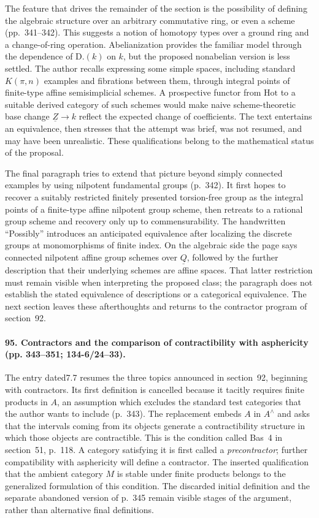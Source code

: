 The feature that drives the remainder of the section is the possibility of defining the algebraic structure over an arbitrary commutative ring, or even a scheme (pp.~341--342). This suggests a notion of homotopy types over a ground ring and a change-of-ring operation. Abelianization provides the familiar model through the dependence of $\mathrm{D.}(k)$ on $k$, but the proposed nonabelian version is less settled. The author recalls expressing some simple spaces, including standard $K(\pi,n)$ examples and fibrations between them, through integral points of finite-type affine semisimplicial schemes. A prospective functor from $\mathrm{Hot}$ to a suitable derived category of such schemes would make naive scheme-theoretic base change $\underline Z\to k$ reflect the expected change of coefficients. The text entertains an equivalence, then stresses that the attempt was brief, was not resumed, and may have been unrealistic. These qualifications belong to the mathematical status of the proposal.

The final paragraph tries to extend that picture beyond simply connected examples by using nilpotent fundamental groups (p.~342). It first hopes to recover a suitably restricted finitely presented torsion-free group as the integral points of a finite-type affine nilpotent group scheme, then retreats to a rational group scheme and recovery only up to commensurability. The handwritten ``Possibly'' introduces an anticipated equivalence after localizing the discrete groups at monomorphisms of finite index. On the algebraic side the page says connected nilpotent affine group schemes over $\underline Q$, followed by the further description that their underlying schemes are affine spaces. That latter restriction must remain visible when interpreting the proposed class; the paragraph does not establish the stated equivalence of descriptions or a categorical equivalence. The next section leaves these afterthoughts and returns to the contractor program of section~92.

\paragraph{95. Contractors and the comparison of contractibility with asphericity (pp. 343--351; 134-6/24--33).}
The entry dated7.7 resumes the three topics announced in section~92, beginning with contractors. Its first definition is cancelled because it tacitly requires finite products in $A$, an assumption which excludes the standard test categories that the author wants to include (p.~343). The replacement embeds $A$ in $A^{\wedge}$ and asks that the intervals coming from its objects generate a contractibility structure in which those objects are contractible. This is the condition called Bas~4 in section~51, p.~118. A category satisfying it is first called a \emph{precontractor}; further compatibility with asphericity will define a contractor. The inserted qualification that the ambient category $M$ is stable under finite products belongs to the generalized formulation of this condition. The discarded initial definition and the separate abandoned version of p.~345 remain visible stages of the argument, rather than alternative final definitions.

